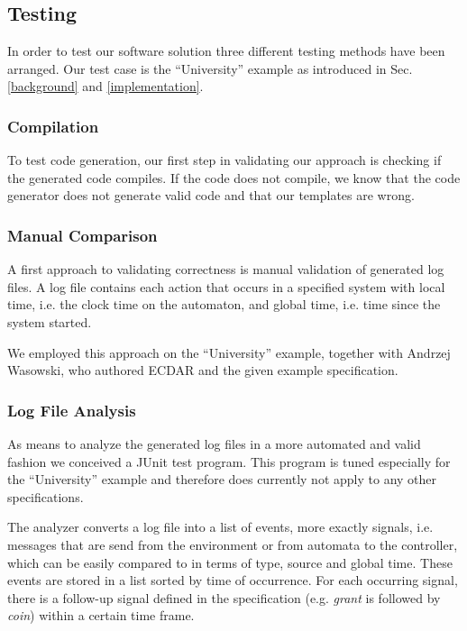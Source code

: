 \subsection{Testing}
\label{Testing}
In order to test our software solution three different testing methods have been
arranged. Our test case is the ``University'' example as introduced in
Sec. \ref{background} and \ref{implementation}.


\subsubsection{Compilation}

To test code generation, our first step in validating our approach is checking
if the generated code compiles. If the code does not compile, we know that the
code generator does not generate valid code and that our templates are wrong.


\subsubsection{Manual Comparison}

A first approach to validating correctness is manual validation of generated log
files. A log file contains each action that occurs in a specified system with
local time, i.e. the clock time on the automaton, and global time, i.e. time
since the system started.

We employed this approach on the ``University'' example, together with Andrzej
Wasowski, who authored ECDAR and the given example specification.

\subsubsection{Log File Analysis}

As means to analyze the generated log files in a more automated and valid
fashion we conceived a JUnit test program. This program is tuned especially for
the ``University'' example and therefore does currently not apply to any other
specifications.

The analyzer converts a log file into a list of events, more exactly signals,
i.e. messages that are send from the environment or from automata to the
controller, which can be easily compared to in terms of type, source and global
time. These events are stored in a list sorted by time of occurrence. For each
occurring signal, there is a follow-up signal defined in the specification
(e.g. \emph{grant} is followed by \emph{coin}) within a certain time frame.

